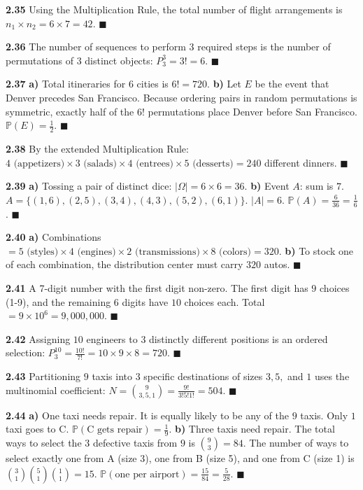 \documentclass[11pt]{article}
\theoremstyle{definition}
\begin{document}
\textbf{2.35} 
Using the Multiplication Rule, the total number of flight arrangements is $n_1 \times n_2 = 6 \times 7 = 42$. $\blacksquare$

\textbf{2.36} 
The number of sequences to perform $3$ required steps is the number of permutations of $3$ distinct objects: $P^3_3 = 3! = 6$. $\blacksquare$

\textbf{2.37} 
\textbf{a)} Total itineraries for $6$ cities is $6! = 720$.
\textbf{b)} Let $E$ be the event that Denver precedes San Francisco. Because ordering pairs in random permutations is symmetric, exactly half of the $6!$ permutations place Denver before San Francisco. $\mathbb{P}(E) = \frac{1}{2}$. $\blacksquare$

\textbf{2.38} 
By the extended Multiplication Rule: $4 \text{ (appetizers)} \times 3 \text{ (salads)} \times 4 \text{ (entrees)} \times 5 \text{ (desserts)} = 240$ different dinners. $\blacksquare$

\textbf{2.39} 
\textbf{a)} Tossing a pair of distinct dice: $|\Omega| = 6 \times 6 = 36$.
\textbf{b)} Event $A$: sum is $7$. $A = \{(1,6), (2,5), (3,4), (4,3), (5,2), (6,1)\}$. $|A| = 6$. $\mathbb{P}(A) = \frac{6}{36} = \frac{1}{6}$. $\blacksquare$

\textbf{2.40} 
\textbf{a)} Combinations $= 5 \text{ (styles)} \times 4 \text{ (engines)} \times 2 \text{ (transmissions)} \times 8 \text{ (colors)} = 320$.
\textbf{b)} To stock one of each combination, the distribution center must carry $320$ autos. $\blacksquare$

\textbf{2.41} 
A 7-digit number with the first digit non-zero. The first digit has $9$ choices (1-9), and the remaining $6$ digits have $10$ choices each. Total $= 9 \times 10^6 = 9,000,000$. $\blacksquare$

\textbf{2.42} 
Assigning $10$ engineers to $3$ distinctly different positions is an ordered selection: $P^{10}_3 = \frac{10!}{7!} = 10 \times 9 \times 8 = 720$. $\blacksquare$

\textbf{2.43} 
Partitioning $9$ taxis into $3$ specific destinations of sizes $3, 5,$ and $1$ uses the multinomial coefficient:
$N = \binom{9}{3, 5, 1} = \frac{9!}{3! 5! 1!} = 504$. $\blacksquare$

\textbf{2.44} 
\textbf{a)} One taxi needs repair. It is equally likely to be any of the $9$ taxis. Only $1$ taxi goes to C. $\mathbb{P}(\text{C gets repair}) = \frac{1}{9}$.
\textbf{b)} Three taxis need repair. The total ways to select the $3$ defective taxis from $9$ is $\binom{9}{3} = 84$. The number of ways to select exactly one from A (size 3), one from B (size 5), and one from C (size 1) is $\binom{3}{1} \binom{5}{1} \binom{1}{1} = 15$. $\mathbb{P}(\text{one per airport}) = \frac{15}{84} = \frac{5}{28}$. $\blacksquare$
\end{document}
